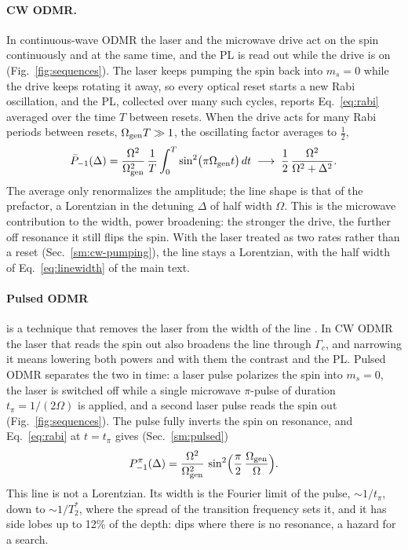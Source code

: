 \paragraph{CW ODMR.} In continuous-wave ODMR the laser and the microwave drive act on the spin continuously and at the
same time, and the PL is read out while the drive is on (Fig.~\ref{fig:sequences}). The laser keeps pumping the spin
back into $m_s=0$ while the drive keeps rotating it away, so every optical reset starts a new Rabi oscillation, and
the PL, collected over many such cycles, reports Eq.~\eqref{eq:rabi} averaged over the time $T$ between resets.
When the drive acts for many Rabi periods between resets, $\Omega_{\rm gen} T\gg1$, the oscillating factor averages to
$\tfrac12$,
\begin{equation}
  \bar P_{-1}(\Delta)=\frac{\Omega^2}{\Omega_{\rm gen}^2}\,\frac1T\int_0^T\sin^2\!\big(\pi\Omega_{\rm gen} t\big)\,dt
  \;\longrightarrow\;\frac12\,\frac{\Omega^2}{\Omega^2+\Delta^2}.
  \label{eq:cw-lorentzian}
\end{equation}
The average only renormalizes the amplitude; the line shape is that of the prefactor, a Lorentzian in the detuning
$\Delta$ of half width $\Omega$. This is the microwave contribution to the width, power broadening: the stronger the
drive, the further off resonance it still flips the spin. With the laser treated as two rates rather than a reset
(Sec.~\ref{sm:cw-pumping}), the line stays a Lorentzian, with the half width of Eq.~\eqref{eq:linewidth} of the
main text.

\paragraph{Pulsed ODMR} is a technique that removes the laser from the width of the line \cite{dreau2011}. In CW ODMR the
laser that reads the spin out also broadens the line through $\Gamma_c$, and narrowing it means lowering both powers
and with them the contrast and the PL. Pulsed ODMR separates the two in time: a laser pulse polarizes the spin into
$m_s=0$, the laser is switched off while a single microwave $\pi$-pulse of duration $t_\pi=1/(2\Omega)$ is applied,
and a second laser pulse reads the spin out (Fig.~\ref{fig:sequences}). The pulse fully inverts the spin on
resonance, and Eq.~\eqref{eq:rabi} at $t=t_\pi$ gives (Sec.~\ref{sm:pulsed})
\begin{equation}
  P_{-1}^{\pi}(\Delta)=\frac{\Omega^2}{\Omega_{\rm gen}^2}\,\sin^2\!\Big(\frac{\pi}{2}\,\frac{\Omega_{\rm gen}}{\Omega}\Big).
  \label{eq:pulsed}
\end{equation}
This line is not a Lorentzian. Its width is the Fourier limit of the pulse, $\sim1/t_\pi$, down to $\sim1/T_2^*$,
where the spread of the transition frequency sets it, and it has side lobes up to 12\% of the depth: dips where there
is no resonance, a hazard for a search.


